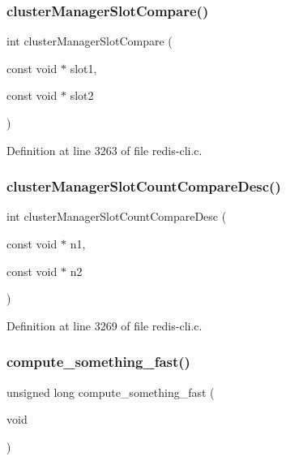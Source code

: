 \subsubsection{\texorpdfstring{cluster\+Manager\+Slot\+Compare()}{clusterManagerSlotCompare()}}
{\footnotesize\ttfamily int cluster\+Manager\+Slot\+Compare (\begin{DoxyParamCaption}\item[{const void $\ast$}]{slot1,  }\item[{const void $\ast$}]{slot2 }\end{DoxyParamCaption})}



Definition at line 3263 of file redis-\/cli.\+c.

\mbox{\label{redis-cli_8c_a63abcc059e6d70d890f2e407b0c2af81}} 
\subsubsection{\texorpdfstring{cluster\+Manager\+Slot\+Count\+Compare\+Desc()}{clusterManagerSlotCountCompareDesc()}}
{\footnotesize\ttfamily int cluster\+Manager\+Slot\+Count\+Compare\+Desc (\begin{DoxyParamCaption}\item[{const void $\ast$}]{n1,  }\item[{const void $\ast$}]{n2 }\end{DoxyParamCaption})}



Definition at line 3269 of file redis-\/cli.\+c.

\mbox{\label{redis-cli_8c_a1342d8c52f123e13a4a55f87819c3f71}} 
\subsubsection{\texorpdfstring{compute\+\_\+something\+\_\+fast()}{compute\_something\_fast()}}
{\footnotesize\ttfamily unsigned long compute\+\_\+something\+\_\+fast (\begin{DoxyParamCaption}\item[{void}]{ }\end{DoxyParamCaption})}



